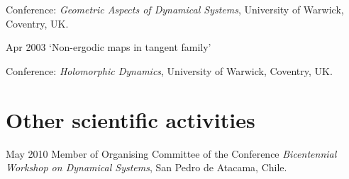 \documentclass{article}
\begin{document}
\begin{CV}
  Conference: {\em Geometric Aspects of Dynamical Systems}, University
  of Warwick, Coventry, UK.
  \item[Apr 2003] `Non-ergodic maps in tangent family'

    Conference: {\em Holomorphic Dynamics}, University of Warwick,
    Coventry, UK.

\section{Other scientific activities}


\item[May 2010] Member of Organising Committee of the Conference
  \emph{ Bicentennial Workshop on Dynamical Systems}, San Pedro de
  Atacama, Chile.


\end{CV}
\end{document}
